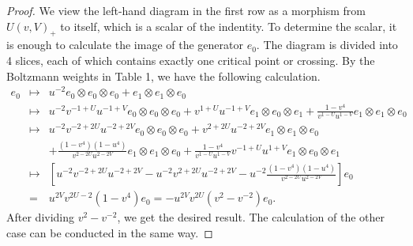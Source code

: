 \documentclass[12pt]{amsart}
\begin{document}
\begin{proof}
We view the left-hand diagram in the first row as a morphism from $U(v, V)_{+}$ to itself, which is a scalar of the indentity. To determine the scalar, it is enough to calculate the image of the generator $e_0$. The diagram is divided into 4 slices, each of which contains exactly one critical point or crossing. By the Boltzmann weights in Table 1, we have the following calculation.  
\begin{eqnarray*}
e_0&\mapsto& u^{-2}e_0\otimes e_0\otimes e_0+e_1\otimes e_1\otimes e_0\\
&\mapsto& u^{-2}v^{-1+U}u^{-1+V}e_0\otimes e_0\otimes e_0+v^{1+U}u^{-1+V}e_1\otimes e_0\otimes e_1+\frac{1-v^4}{v^{1-U}u^{1-V}}e_1\otimes e_1\otimes e_0\\
&\mapsto& u^{-2}v^{-2+2U}u^{-2+2V}e_0\otimes e_0\otimes e_0+v^{2+2U}u^{-2+2V}e_1\otimes e_1\otimes e_0\\
&&+\frac{(1-v^4)(1-u^4)}{v^{2-2U}u^{2-2V}} e_1\otimes e_1\otimes e_0+\frac{1-v^4}{v^{1-U}u^{1-V}}v^{-1+U}u^{1+V}e_1\otimes e_0\otimes e_1\\
&\mapsto& [u^{-2}v^{-2+2U}u^{-2+2V}-u^{-2}v^{2+2U}u^{-2+2V}-u^{-2}\frac{(1-v^4)(1-u^4)}{v^{2-2U}u^{2-2V}}]e_0\\
&=& u^{2V}v^{2U-2}(1-v^{4})e_0=-u^{2V}v^{2U}(v^2-v^{-2})e_0.
\end{eqnarray*}
After dividing $v^2-v^{-2}$, we get the desired result. The calculation of the other case can be conducted in the same way.
\end{proof}




\end{document}
